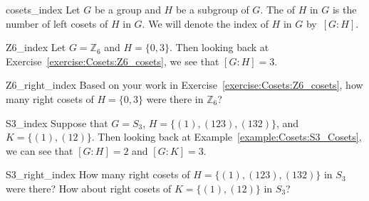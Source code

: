 \begin{defn}{cosets_index}
Let $G$ be a group and $H$ be a subgroup of $G$.  The  of $H$ in $G$ is the number of left cosets of $H$ in $G$.  We will denote the index of $H$ in $G$  by~$[G:H]$\label{indexofasubgroup}.
\end{defn}  

\begin{example}{Z6_index}
Let $G= {\mathbb Z}_6$ and $H = \{ 0, 3 \}$. Then looking back at Exercise~\ref{exercise:Cosets:Z6_cosets}, we see that $[G:H] = 3$.
\end{example}

\begin{exercise}{Z6_right_index}
Based on your work in  Exercise~\ref{exercise:Cosets:Z6_cosets}, how many right cosets of  $H = \{ 0, 3 \}$ were there in ${\mathbb Z}_6$?
\end{exercise}

\begin{example}{S3_index}
Suppose that $G= S_3$, $H = \{ (1),(123), (132) \}$, and $K= \{ (1), (12) \}$.  Then looking back at Example~\ref{example:Cosets:S3_Cosets}, we can see that $[G:H] = 2$ and $[G:K] = 3$. 
\end{example}

\begin{exercise}{S3_right_index}
How many right cosets of  $H = \{ (1),(123), (132) \}$ in $S_3$ were there?  How about right cosets of  $K= \{ (1), (12) \}$ in $S_3$?
\end{exercise}

